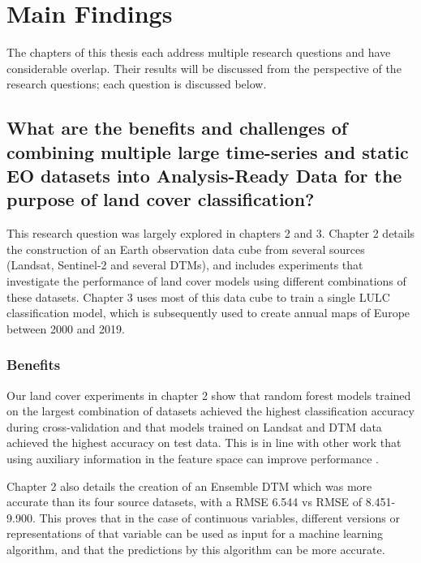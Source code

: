 \section{Main Findings}
    The chapters of this thesis each address multiple research questions and have considerable overlap. Their results will be discussed from the perspective of the research questions; each question is discussed below.
    
    \subsection{What are the benefits and challenges of combining multiple large time-series and static EO datasets into Analysis-Ready Data for the purpose of land cover classification?}
    \label{syn:rq1}

        This research question was largely explored in chapters 2 and 3. Chapter 2 details the construction of an Earth observation data cube from several sources (Landsat, Sentinel-2 and several DTMs), and includes experiments that investigate the performance of land cover models using different combinations of these datasets. Chapter 3 uses most of this data cube to train a single LULC classification model, which is subsequently used to create annual maps of Europe between 2000 and 2019. 

        \subsubsection{Benefits}
    
            Our land cover experiments in chapter 2 show that random forest models trained on the largest combination of datasets achieved the highest classification accuracy during cross-validation and that models trained on Landsat and DTM data achieved the highest accuracy on test data. This is in line with other work that using auxiliary information in the feature space can improve performance \citep{zhu2016optimizing, hurskainen2019auxiliary, hosseiny2022urban, santos2012multiscale}.

            Chapter 2 also details the creation of an Ensemble DTM which was more accurate than its four source datasets, with a RMSE 6.544 vs RMSE of 8.451-9.900. This proves that in the case of continuous variables, different versions or representations of that variable can be used as input for a machine learning algorithm, and that the predictions by this algorithm can be more accurate.
            
